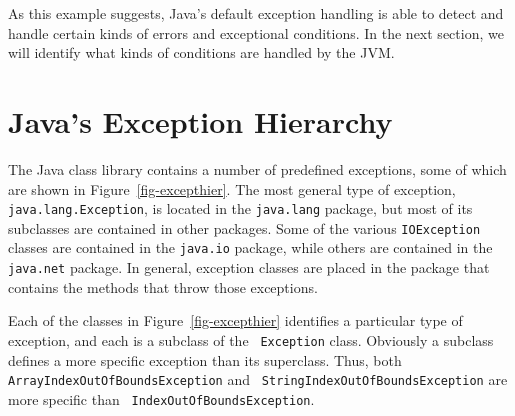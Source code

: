 As this example suggests, Java's default exception handling is able to
detect and handle certain kinds of errors and exceptional conditions. In
the next section, we will identify what kinds of conditions are handled
by the JVM.

\section{Java's Exception Hierarchy}
\label{sec-excepthier}\label{pg-sec-excepthier}

\begin{figure}[tb]
\end{figure}

\noindent The Java class library contains a number of predefined exceptions,
some of which are shown in Figure~\ref{fig-excepthier}.  The most
general type of exception, {\tt java.lang.Exception}, is located in
the {\tt java.lang} package, but most of its subclasses
are contained in other packages.  Some of the various {\tt IOException}
classes are contained in the {\tt java.io} package, while others are
contained in the {\tt java.net}
package.  In general, exception classes are placed in the package that
contains the methods that throw those exceptions.

Each of the classes in Figure~\ref{fig-excepthier} identifies a
particular type of exception, and each is a subclass of the {\tt
Exception} class.  Obviously a subclass defines a more specific
exception than its superclass.  Thus, both {\tt
Array\-IndexOutOfBoundsException} and {\tt
StringIndexOutOfBounds\-Excep\-tion} are more specific than {\tt
Index\-OutOfBoundsException}.  


